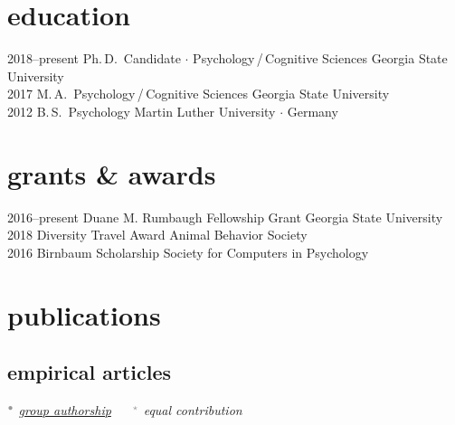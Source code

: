 \documentclass[]{friggeri-cv}
\begin{document}
\section{education}

\begin{entrylist}
  \entry
    {2018--present}
    {Ph.\,D.~Candidate $\cdot$ Psychology\,/\,Cognitive Sciences}
    {Georgia State University}
    {\\[-.3cm]}
 \entry
   {2017}
   {M.\,A.~Psychology\,/\,Cognitive Sciences}
   {Georgia State University}
   {\\[-.3cm]}
  \entry
    {2012}
    {B.\,S.~Psychology}
    {Martin Luther University $\cdot$ Germany}
    {\\[-.3cm]}
\end{entrylist}


\section{grants \& awards}

\begin{entrylist}
  \entry
    {2016--present}
    {Duane M. Rumbaugh Fellowship Grant}
    {Georgia State University}
    {\\[-.3cm]}
  \entry
    {2018}
    {Diversity Travel Award}
    {Animal Behavior Society}
    {\\[-.3cm]}
  \entry
    {2016}
    {Birnbaum Scholarship}
    {Society for Computers in Psychology}
    {\\[-.3cm]}
\end{entrylist}



\section{publications}


\subsection{empirical articles}
\vspace{-.1cm}\hspace{.7cm}
{\small{} $\color{lightgray} {}^\bullet$ \emph{\color{lightgray} \ul{group authorship}} $\quad$ %
{\normalsize $\color{lightgray} {}^\star$} \emph{\color{lightgray} equal contribution}}\\[.5cm]
\end{document}

